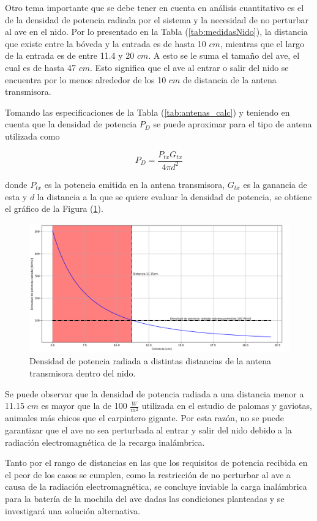 Otro tema importante que se debe tener en cuenta en análisis cuantitativo es el de la densidad de potencia radiada por el sistema y la necesidad de no perturbar al ave en el nido. Por lo presentado en la Tabla (\ref{tab:medidasNido}), la distancia que existe entre la bóveda y la entrada es de hasta 10 $cm$, mientras que el largo de la entrada es de entre 11.4 y 20 $cm$. A esto se le suma el tamaño del ave, el cual es de hasta 47 $cm$. Esto significa que el ave al entrar o salir del nido se encuentra por lo menos alrededor de los 10 $cm$ de distancia de la antena transmisora.

Tomando las especificaciones de la Tabla (\ref{tab:antenas_calc}) y teniendo en cuenta que la densidad de potencia $P_D$ se puede aproximar para el tipo de antena utilizada como

\begin{equation}
P_D = \frac{P_{tx}G_{tx}}{4\pi d^2}
\end{equation}

donde $P_{tx}$ es la potencia emitida en la antena transmisora, $G_{tx}$ es la ganancia de esta y $d$ la distancia a la que se quiere evaluar la densidad de potencia, se obtiene el gráfico de la Figura (\ref{fig:antenas_densidad_radiada}). 

\begin{figure}[H]
	\centering
	\includegraphics[width=\linewidth]{ImagenesFactibilidad/antenas_densidad_radiada}
	\caption{Densidad de potencia radiada a distintas distancias de la antena transmisora dentro del nido.}
	\label{fig:antenas_densidad_radiada}
\end{figure}

Se puede observar que la densidad de potencia radiada a una distancia menor a 11.15 $cm$ es mayor que la de 100 $\frac{W}{m^2}$ utilizada en el estudio de palomas y gaviotas\cite{ref:effect-radiation}, animales más chicos que el carpintero gigante. Por esta razón, no se puede garantizar que el ave no sea perturbada al entrar y salir del nido debido a la radiación electromagnética de la recarga inalámbrica.


Tanto por el rango de distancias en las que los requisitos de potencia recibida en el peor de los casos se cumplen, como la restricción de no perturbar al ave a causa de la radiación electromagnética, se concluye inviable la carga inalámbrica para la batería de la mochila del ave dadas las condiciones planteadas y se investigará una solución alternativa.